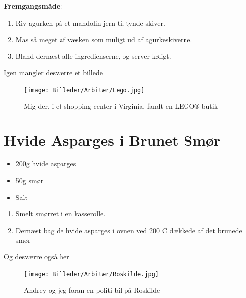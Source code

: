 \documentclass{book}
\begin{document}
\begin{minipage}[t]{0.5\textwidth}
\textbf{Fremgangsmåde:}
\begin{enumerate}
    \item Riv agurken på et mandolin jern til tynde skiver.
    \item Mas så meget af væsken som muligt ud af agurkeskiverne.
    \item Bland dernæst alle ingredienserne, og server køligt.
\end{enumerate}
\end{minipage}
\newpage 
Igen mangler desværre et billede 
\begin{figure}
    \centering
    \texttt{[image: Billeder/Arbitær/Lego.jpg]}
    \caption{Mig der, i et shopping center i Virginia, fandt en LEGO® butik}
    
\end{figure}
\newpage \section{Hvide Asparges i Brunet Smør}
\begin{minipage}[t]{0.5\textwidth}
\begin{itemize}
    \item 200g hvide asparges 
    \item 50g smør
    \item Salt
\end{itemize}
\end{minipage}
\begin{minipage}[t]{0.5\textwidth}
\begin{enumerate}
    \item Smelt smørret i en kasserolle.
    \item Dernæst bag de hvide asparges i ovnen ved 200 \degree C dækkede af det brunede smør
\end{enumerate}
\end{minipage}
\newpage 
Og desværre også her 
\begin{figure}
    \centering
    \texttt{[image: Billeder/Arbitær/Roskilde.jpg]}
    \caption{Andrey og jeg foran en politi bil på Roskilde}
    
\end{figure}
\end{document}
